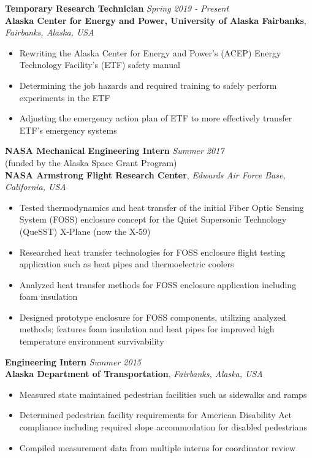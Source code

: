 \documentclass[12pt,a4paper]{article}
\begin{document}
\textbf{Temporary Research Technician} \textit{Spring 2019 - Present}\\
\textbf{Alaska Center for Energy and Power, University of Alaska Fairbanks}, \textit{Fairbanks, Alaska, USA}
\begin{itemize}
\item Rewriting the Alaska Center for Energy and Power's (ACEP) Energy Technology Facility's (ETF) safety manual
\item Determining the job hazards and required training to safely perform experiments in the ETF
\item Adjusting the emergency action plan of ETF to more effectively transfer ETF's emergency systems
\end{itemize}
\textbf{NASA Mechanical Engineering Intern} \textit{Summer 2017}\\
(funded by the Alaska Space Grant Program)\\
\textbf{NASA Armstrong Flight Research Center}, \textit{Edwards Air Force Base, California, USA}
\begin{itemize}
\item Tested thermodynamics and heat transfer of the initial Fiber Optic Sensing System (FOSS)
enclosure concept for the Quiet Supersonic Technology (QueSST) X-Plane (now the X-59)
\item Researched heat transfer technologies for FOSS enclosure flight testing application such
as heat pipes and thermoelectric coolers
\item Analyzed heat transfer methods for FOSS enclosure application including foam insulation
\item Designed prototype enclosure for FOSS components, utilizing analyzed methods; features
foam insulation and heat pipes for improved high temperature environment survivability
\end{itemize}

\textbf{Engineering Intern} \textit{Summer 2015}\\
\textbf{Alaska Department of Transportation}, \textit{Fairbanks, Alaska, USA}
\begin{itemize}
\item Measured state maintained pedestrian facilities such as sidewalks and ramps
\item Determined pedestrian facility requirements for American Disability Act compliance
including required slope accommodation for disabled pedestrians
\item Compiled measurement data from multiple interns for coordinator review
\end{itemize}
\end{document}
